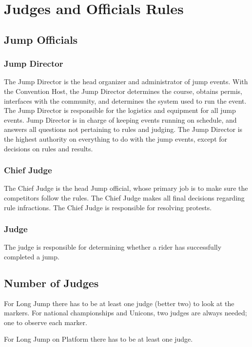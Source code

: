 \chapter{Judges and Officials Rules}

\section{Jump Officials}

\subsection{Jump Director}

The Jump Director is the head organizer and administrator of jump events.
With the Convention Host, the Jump Director determines the course, obtains permis, interfaces with the community, and determines the system used to run the event.
The Jump Director is responsible for the logistics and equipment for all jump events.
Jump Director is in charge of keeping events running on schedule, and answers all questions not pertaining to rules and judging.
The Jump Director is the highest authority on everything to do with the jump events, except for decisions on rules and results.

\subsection{Chief Judge}

The Chief Judge is the head Jump official, whose primary job is to make sure the competitors follow the rules.
The Chief Judge makes all final decisions regarding rule infractions.
The Chief Judge is responsible for resolving protests.

\subsection{Judge}

The judge is responsible for determining whether a rider has successfully completed a jump.

\section{Number of Judges}

For Long Jump there has to be at least one judge (better two) to look at the markers.
For national championships and Unicons, two judges are always needed; one to observe each marker.

For Long Jump on Platform there has to be at least one judge.
